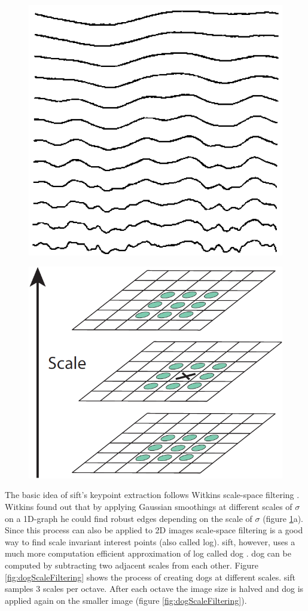 \begin{figure}
	\centering
	\begin{minipage}{.5\textwidth}
		\centering
		\includegraphics[width=0.45\linewidth]{figures/theorySIFT_scaleSpaceFiltering}
		\label{fig:scaleSpaceFiltering}
	\end{minipage}%
	\begin{minipage}{.5\textwidth}
			\centering
			\includegraphics[width=0.45\linewidth]{figures/theorySIFT_interestPointDetection}
			\label{fig:interestPointDetection}
	\end{minipage}	
\end{figure}


The basic idea of \gls{sift}'s keypoint extraction follows Witkins scale-space filtering \cite{Witkin1983}. Witkins found out that by applying Gaussian smoothings at different scales of $\sigma$ on a 1D-graph he could find robust edges depending on the scale of $\sigma$ {(figure \ref{fig:interestPointDetection}a)}. Since this process can also be applied to 2D images scale-space filtering is a good way to find scale invariant interest points {(also called \gls{log})}. \gls{sift}, however, uses a much more computation efficient approximation of \gls{log} called \acrfull{dog} \cite{Lowe2004}. \gls{dog} can be computed by subtracting two adjacent scales from each other. Figure \ref{fig:dogScaleFiltering} shows the process of creating \glspl{dog} at different scales. \gls{sift} samples 3 scales per octave. After each octave the image size is halved and \gls{dog} is applied again on the smaller image {(figure \ref{fig:dogScaleFiltering})}.

